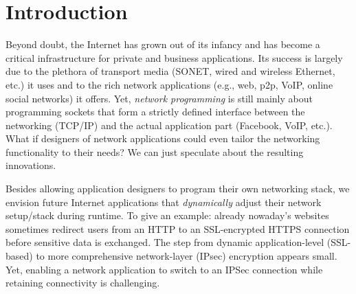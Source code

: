 \documentclass{sig-alternate}
\begin{document}



\section{Introduction}
Beyond doubt, the Internet has grown out of its infancy and has become a
critical infrastructure for private and business applications. Its success is
largely due to the plethora of transport media (SONET, wired and wireless
Ethernet, etc.) it uses and to the rich network applications (e.g., web, p2p, VoIP,
online social networks) it offers. Yet, \emph{network programming} is still
mainly about programming sockets that form a strictly defined interface between
the networking (TCP/IP) and the actual application part (Facebook, VoIP, etc.).
What if designers of network applications could even tailor the networking
functionality to their needs? We can just speculate about the resulting
innovations. 

Besides allowing application designers to program their own networking stack,
we envision future Internet applications that \emph{dynamically} adjust their
network setup/stack during runtime. To give an example: already nowaday's
websites sometimes redirect users from an HTTP to an SSL-encrypted HTTPS
connection before sensitive data is exchanged. The step from dynamic
application-level (SSL-based) to more comprehensive network-layer (IPsec)
encryption appears small. Yet, enabling a network application to switch to an
IPSec connection while retaining connectivity is challenging. 
\end{document}
